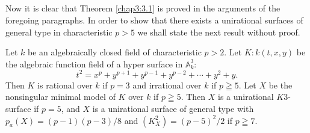 \subsection{}\label{chap3:3.8}
Now it is clear that Theorem \ref{chap3:3.1} is proved in the arguments
of the foregoing paragraphs. In order to show that there exists a
unirational surfaces of general type in characteristic $p>5$ we shall
state the next result without proof.

\begin{prop*}
Let $k$ be an algebraically closed field of characteristic $p>2$. Let
$K:k(t,x,y)$ be the algebraic function field of a hyper surface in
$\mathbb{A}^{3}_{k}$:
$$
t^{2}=x^{p}+y^{p+1}+y^{p-1}+y^{p-2}+\cdots+y^{2}+y.
$$
Then $K$ is rational over $k$ if $p=3$ and irrational over $k$ if
$p\geqq 5$. Let $X$ be the nonsingular minimal model of $K$ over $k$
if $p\geqq 5$. Then $X$ is a unirational $K3$-surface if $p=5$, and
$X$ is a unirational surface of general type with
$p_{a}(X)=(p-1)(p-3)/8$ and $(K^{2}_{X})=(p-5)^{2}/2$ if $p\geqq 7$.
\end{prop*}

\bigskip

